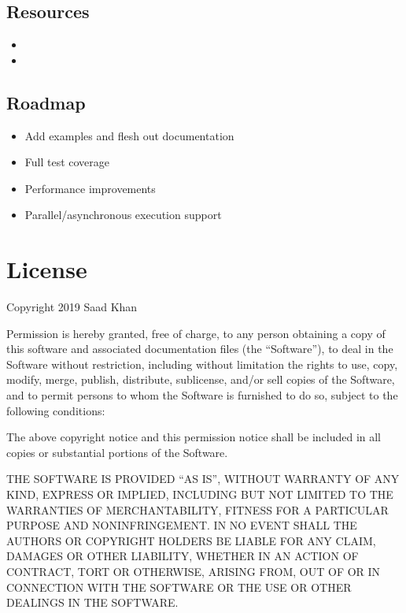 \documentclass[letterpaper,10pt,english]{sphinxmanual}
\begin{document}
\subsection{Resources}
\label{\detokenize{Project:resources}}\begin{itemize}
\item {} 

\item {} 

\end{itemize}


\subsection{Roadmap}
\label{\detokenize{Project:roadmap}}\begin{itemize}
\item {} 
Add examples and flesh out documentation

\item {} 
Full test coverage

\item {} 
Performance improvements

\item {} 
Parallel/asynchronous execution support

\end{itemize}


\section{License}
\label{\detokenize{License:license}}\label{\detokenize{License::doc}}
Copyright 2019 Saad Khan

Permission is hereby granted, free of charge, to any person obtaining a copy of this software and associated documentation files (the “Software”), to deal in the Software without restriction, including without limitation the rights to use, copy, modify, merge, publish, distribute, sublicense, and/or sell copies of the Software, and to permit persons to whom the Software is furnished to do so, subject to the following conditions:

The above copyright notice and this permission notice shall be included in all copies or substantial portions of the Software.

THE SOFTWARE IS PROVIDED “AS IS”, WITHOUT WARRANTY OF ANY KIND, EXPRESS OR IMPLIED, INCLUDING BUT NOT LIMITED TO THE WARRANTIES OF MERCHANTABILITY, FITNESS FOR A PARTICULAR PURPOSE AND NONINFRINGEMENT. IN NO EVENT SHALL THE AUTHORS OR COPYRIGHT HOLDERS BE LIABLE FOR ANY CLAIM, DAMAGES OR OTHER LIABILITY, WHETHER IN AN ACTION OF CONTRACT, TORT OR OTHERWISE, ARISING FROM, OUT OF OR IN CONNECTION WITH THE SOFTWARE OR THE USE OR OTHER DEALINGS IN THE SOFTWARE.
\end{document}
